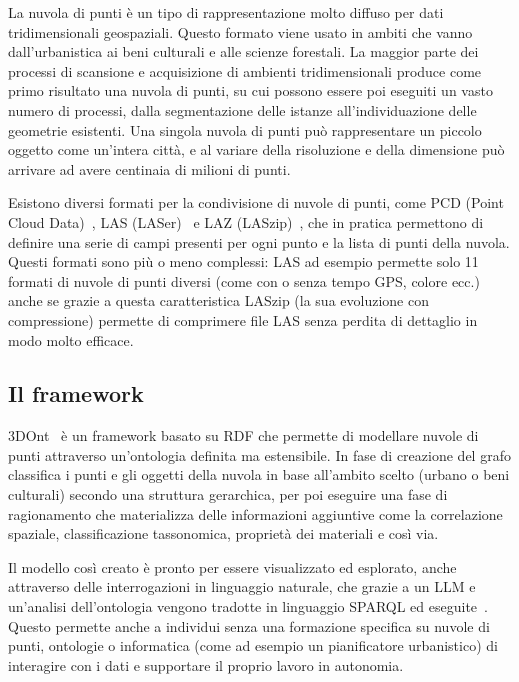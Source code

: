 La nuvola di punti è un tipo di rappresentazione molto diffuso per dati tridimensionali geospaziali. Questo formato viene usato
in ambiti che vanno dall'urbanistica ai beni culturali e alle scienze forestali. La maggior parte dei processi di scansione e 
acquisizione di ambienti tridimensionali produce come primo risultato una nuvola di punti, su cui possono essere poi eseguiti un
vasto numero di processi, dalla segmentazione delle istanze all'individuazione delle geometrie esistenti. Una singola nuvola di punti
può rappresentare un piccolo oggetto come un'intera città, e al variare della risoluzione e della dimensione può arrivare ad avere
centinaia di milioni di punti. 
\par Esistono diversi formati per la condivisione di nuvole di punti, come PCD (Point Cloud Data)~\cite{rusu2011pcl},
LAS (LASer)~\cite{asprs-las14} e LAZ (LASzip)~\cite{isenburg2013laszip},
che in pratica permettono di definire una serie di campi presenti per ogni punto e la lista di punti della nuvola. Questi formati
sono più o meno complessi: LAS ad esempio permette solo 11 formati di nuvole di punti diversi (come con o senza tempo GPS, colore ecc.)
anche se grazie a questa caratteristica LASzip (la sua evoluzione con compressione) permette di comprimere file LAS senza perdita 
di dettaglio in modo molto efficace.

\subsection{Il framework}

3DOnt~\cite{codiglione2024urban,codiglione2024heritage} è un framework basato su RDF che permette di modellare nuvole di punti
attraverso un'ontologia definita ma estensibile.
In fase di creazione del grafo classifica i punti e gli oggetti della nuvola in base all'ambito scelto (urbano o beni culturali)
secondo una struttura gerarchica, per poi eseguire una fase di ragionamento che materializza delle informazioni aggiuntive come la
correlazione spaziale, classificazione tassonomica, proprietà dei materiali e così via.
\par Il modello così creato è pronto per essere visualizzato ed esplorato, anche attraverso delle interrogazioni in linguaggio naturale,
che grazie a un LLM e un'analisi dell'ontologia vengono tradotte in linguaggio SPARQL ed eseguite~\cite{codiglione2025nl2sparql}. Questo permette anche a individui
senza una formazione specifica su nuvole di punti, ontologie o informatica (come ad esempio un pianificatore urbanistico) 
di interagire con i dati e supportare il proprio lavoro in autonomia.

